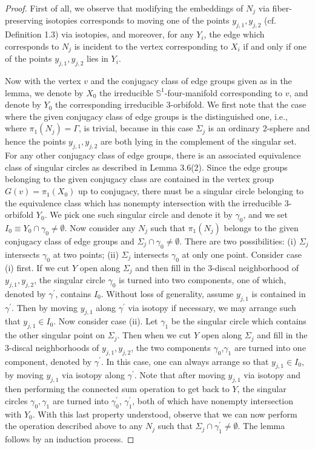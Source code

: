 \documentclass[11pt]{amsart}
\theoremstyle{plain}
\numberwithin{theorem}{section}
\theoremstyle{definition}
\begin{document}
\begin{proof}
First of all, we observe that modifying the embeddings of $N_j$ via fiber-preserving isotopies corresponds to moving one of the points $y_{j,1},y_{j,2}$ (cf. Definition 1.3) via isotopies, and moreover, for any $Y_i$, the edge which corresponds to $N_j$ is incident to the vertex corresponding to $X_i$ if and only if one of the points $y_{j,1},y_{j,2}$ lies in $Y_i$. 

Now with the vertex $v$ and the conjugacy class of edge groups given as in the lemma, 
we denote by $X_0$ the irreducible ${{\mathbb S}}^1$-four-manifold corresponding to $v$, 
and denote by $Y_0$ the corresponding irreducible $3$-orbifold. We first note that the case 
where the given conjugacy class of edge groups is the distinguished one, i.e., where 
$\pi_1(N_j)=\Gamma$, is trivial, because in this case
$\Sigma_j$ is an ordinary $2$-sphere and hence the points $y_{j,1},y_{j,2}$ are both lying in the complement of the singular set. For any other conjugacy class of edge groups, there is an 
associated equivalence class of singular circles as described in Lemma 3.6(2). 
Since the edge groups belonging to the given conjugacy class are contained in the vertex group $G(v)=\pi_1(X_0)$ up to conjugacy, 
there must be a singular circle belonging to the equivalence class which has nonempty intersection with the irreducible $3$-orbifold $Y_0$. We pick one such singular circle and denote it by $\gamma_0$, and we set
$I_0\equiv Y_0\cap \gamma_0\neq \emptyset$. Now consider any $N_j$ such that $\pi_1(N_j)$ belongs to the given conjugacy class of edge groups and $\Sigma_j\cap \gamma_0\neq
\emptyset$. There are two possibilities: (i) $\Sigma_j$ intersects $\gamma_0$ at two points;
(ii) $\Sigma_j$ intersects $\gamma_0$ at only one point. Consider case (i) first.  If we cut $Y$ 
open along $\Sigma_j$ and then fill in the $3$-discal neighborhood of $y_{j,1},y_{j,2}$, the 
singular circle $\gamma_0$ is turned into two components, one of which, denoted by 
$\gamma^\prime$, contains $I_0$. Without loss of generality, assume $y_{j,1}$ is contained 
in $\gamma^\prime$. Then by moving $y_{j,1}$ along $\gamma^\prime$ via isotopy if 
necessary, we may arrange such that $y_{j,1}\in I_0$. Now consider case (ii).
Let $\gamma_1$ be the singular circle which contains the other singular point on 
$\Sigma_j$. Then when we cut $Y$ open along $\Sigma_j$ and fill in the $3$-discal 
neighborhoods of $y_{j,1},y_{j,2}$, the two components $\gamma_0$,$\gamma_1$ 
are turned into one component, denoted by $\gamma^\prime$. In this case, one can always 
arrange so that $y_{j,1}\in I_0$, by moving $y_{j,1}$ via isotopy along $\gamma^\prime$. 
Note that after moving $y_{j,1}$ via isotopy and then performing the connected sum operation 
to get back to $Y$, the singular circles $\gamma_0,\gamma_1$ are turned into 
$\gamma_0^\prime$, $\gamma_1^\prime$, both of which have nonempty intersection with 
$Y_0$. With this last property understood, observe that we can now perform the operation 
described above to any $N_j$ such that $\Sigma_j\cap \gamma_1^\prime\neq \emptyset$. 
The lemma follows by an induction process. 

\end{proof}
\end{document}
